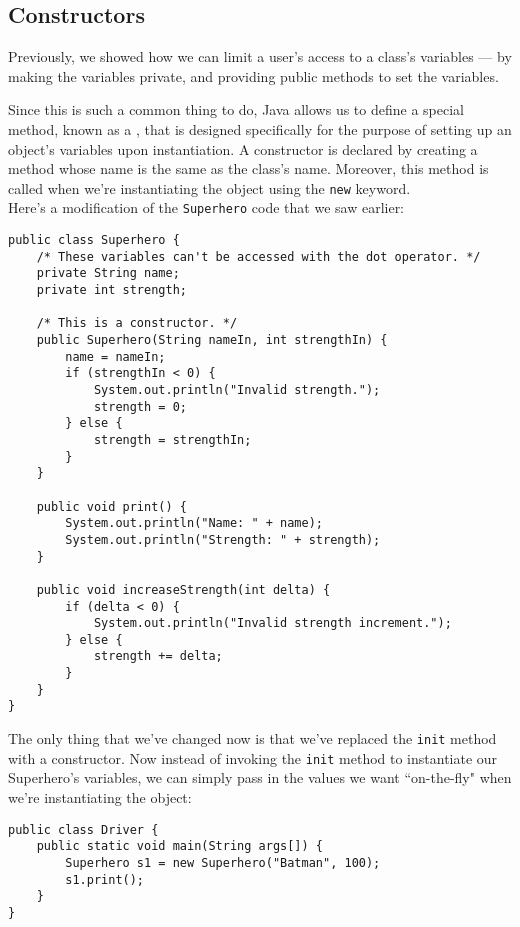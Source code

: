 \subsection{Constructors}

Previously, we showed how we can limit a user's access to a class's variables --- by making the variables private, and providing public methods to set the variables. 

Since this is such a common thing to do, Java allows us to define a special method, known as a , that is designed specifically for the purpose of setting up an object's variables upon instantiation. A constructor is declared by creating a method whose name is the same as the class's name. Moreover, this method is called when we're instantiating the object using the \verb!new! keyword. \\

Here's a modification of the \verb!Superhero! code that we saw earlier:

\begin{lstlisting}
public class Superhero {
    /* These variables can't be accessed with the dot operator. */
    private String name;
    private int strength;
    
    /* This is a constructor. */
    public Superhero(String nameIn, int strengthIn) {
        name = nameIn;
        if (strengthIn < 0) {
            System.out.println("Invalid strength.");
            strength = 0;
        } else {
            strength = strengthIn;
        }  
    }
    
    public void print() {
        System.out.println("Name: " + name);
        System.out.println("Strength: " + strength);
    }
    
    public void increaseStrength(int delta) {
        if (delta < 0) {
            System.out.println("Invalid strength increment.");
        } else {
            strength += delta;
        }
    }
}
\end{lstlisting}

The only thing that we've changed now is that we've replaced the \verb!init! method with a constructor. Now instead of invoking the \verb!init! method to instantiate our Superhero's variables, we can simply pass in the values we want ``on-the-fly" when we're instantiating the object:

\begin{lstlisting}
public class Driver {
    public static void main(String args[]) {
        Superhero s1 = new Superhero("Batman", 100);
        s1.print();
    }
}
\end{lstlisting}

